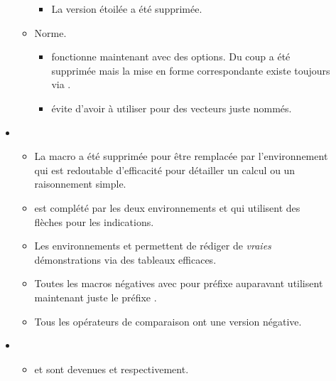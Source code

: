 \documentclass[12pt,a4paper]{book}
\begin{document}
\begin{description}
\begin{itemize}[itemsep=.5em]
\begin{itemize}[itemsep=.5em]
\begin{itemize}[itemsep=.5em, label=$\rightarrow$]
            \item La version étoilée  a été supprimée. 
	    \end{itemize}



        \item Norme.
        
        \begin{itemize}[itemsep=.5em, label=$\rightarrow$]
            \item {} fonctionne maintenant avec des options.
                  Du coup  a été supprimée mais la mise en forme correspondante existe toujours via .

			\item {} évite d'avoir à utiliser  pour des vecteurs juste nommés.
	    \end{itemize}
    \end{itemize}




    \separation
    \item {}
    \begin{itemize}[itemsep=.5em]
        \item La macro  a été supprimée pour être remplacée par l'environnement  qui est redoutable d'efficacité pour détailler un calcul ou un raisonnement simple.
        
        \item {} est complété par les deux environnements  et  qui utilisent des flèches pour les indications.

        \item Les environnements  et  permettent de rédiger de \emph{\og vraies \fg} démonstrations via des tableaux efficaces.

        \item Toutes les macros négatives avec pour préfixe  auparavant utilisent maintenant juste le préfixe .

        \item Tous les opérateurs de comparaison ont une version négative.
    \end{itemize}




    \separation
    \item {}
    \begin{itemize}[itemsep=.5em]
        \item {} et  sont devenues  et  respectivement.
        

\end{itemize}
\end{itemize}
\end{description}
\end{document}
